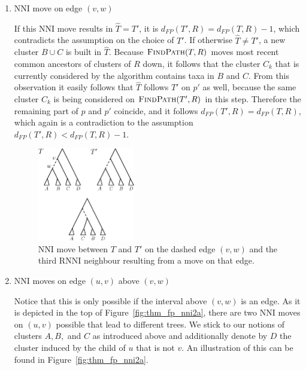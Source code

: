 \documentclass{amsart}
\newcommand{\rnni}{\mathrm{RNNI}}
\newcommand{\findpath}{\textsc{FindPath}}
\newcommand{\nni}{\mathrm{NNI}}
\begin{document}
\begin{enumerate}
    \item $\nni$ move on edge $(v,w)$

    If this $\nni$ move results in $\hat T = T'$, it is $d_{FP}(T',R) = d_{FP}(T,R) - 1$, which contradicts the assumption on the choice of $T'$.
    If otherwise $\hat T \neq T'$, a new cluster $B \cup C$ is built in $\hat T$.
    Because $\findpath(T,R)$ moves most recent common ancestors of clusters of $R$ down, it follows that the cluster $C_k$ that is currently considered by the algorithm contains taxa in $B$ and $C$.
    From this observation it easily follows that $\hat T$ follows $T'$ on $p'$ as well, because the same cluster $C_k$ is being considered on $\findpath(T',R)$ in this step.
    Therefore the remaining part of $p$ and $p'$ coincide, and it follows $d_{FP}(T',R) = d_{FP}(T,R)$, which again is a contradiction to the assumption $d_{FP}(T',R) < d_{FP}(T,R) - 1$.

    \begin{figure}[!hbt]
    \centering
    \includegraphics[width=0.4\textwidth]{thm_fp_nni1}
    \vspace{12pt}
    \caption{$\nni$ move between $T$ and $T'$ on the dashed edge $(v,w)$ and the third $\rnni$ neighbour resulting from a move on that edge.}
    \label{fig:thm_fp_nni1}
    \end{figure}

    \item $\nni$ moves on edge $(u,v)$ above $(v,w)$

    Notice that this is only possible if the interval above $(v,w)$ is an edge.
    As it is depicted in the top of Figure~\ref{fig:thm_fp_nni2a}, there are two $\nni$ moves on $(u,v)$ possible that lead to different trees.
    We stick to our notions of clusters $A,B,$ and $C$ as introduced above and additionally denote by $D$ the cluster induced by the child of $u$ that is not $v$.
    An illustration of this can be found in Figure~\ref{fig:thm_fp_nni2a}.


\end{enumerate}
\end{document}
